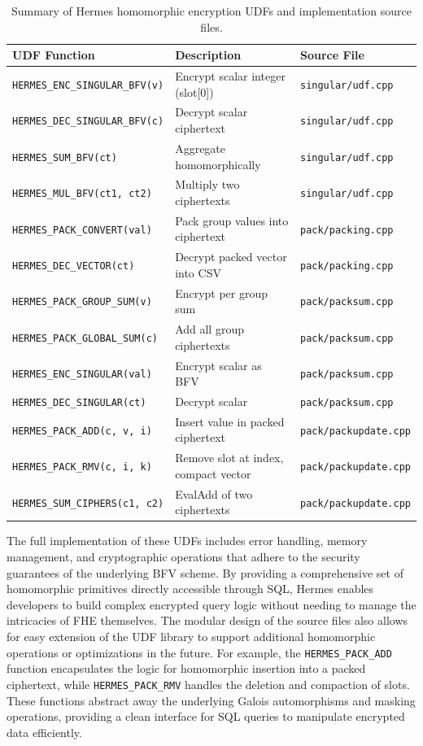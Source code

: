\documentclass[sigconf,nonacm]{acmart}
\begin{document}
\begin{table}[t]
\centering
\caption{Summary of Hermes homomorphic encryption UDFs and implementation source files.}
\label{tab:udf_list}
\scriptsize
\setlength{\tabcolsep}{2pt}
\begin{tabularx}{\columnwidth}{l X l}
\toprule
UDF Function & Description & Source File \\
\midrule
\texttt{HERMES\_ENC\_SINGULAR\_BFV(v)} & Encrypt scalar integer (slot[0]) & \texttt{singular/udf.cpp} \\
\texttt{HERMES\_DEC\_SINGULAR\_BFV(c)} & Decrypt scalar ciphertext & \texttt{singular/udf.cpp} \\
\texttt{HERMES\_SUM\_BFV(ct)} & Aggregate homomorphically & \texttt{singular/udf.cpp} \\
\texttt{HERMES\_MUL\_BFV(ct1, ct2)} & Multiply two ciphertexts & \texttt{singular/udf.cpp} \\
\addlinespace
\texttt{HERMES\_PACK\_CONVERT(val)} & Pack group values into ciphertext & \texttt{pack/packing.cpp} \\
\texttt{HERMES\_DEC\_VECTOR(ct)} & Decrypt packed vector into CSV & \texttt{pack/packing.cpp} \\
\texttt{HERMES\_PACK\_GROUP\_SUM(v)} & Encrypt per group sum & \texttt{pack/packsum.cpp} \\
\texttt{HERMES\_PACK\_GLOBAL\_SUM(c)} & Add all group ciphertexts & \texttt{pack/packsum.cpp} \\
\addlinespace
\texttt{HERMES\_ENC\_SINGULAR(val)} & Encrypt scalar as BFV & \texttt{pack/packsum.cpp} \\
\texttt{HERMES\_DEC\_SINGULAR(ct)} & Decrypt scalar & \texttt{pack/packsum.cpp} \\
\texttt{HERMES\_PACK\_ADD(c, v, i)} & Insert value in packed ciphertext & \texttt{pack/packupdate.cpp} \\
\texttt{HERMES\_PACK\_RMV(c, i, k)} & Remove slot at index, compact vector & \texttt{pack/packupdate.cpp} \\
\texttt{HERMES\_SUM\_CIPHERS(c1, c2)} & EvalAdd of two ciphertexts & \texttt{pack/packupdate.cpp} \\
\bottomrule
\end{tabularx}
\end{table}

The full implementation of these UDFs includes error handling, memory management, and cryptographic operations that adhere to the security guarantees of the underlying BFV scheme. By providing a comprehensive set of homomorphic primitives directly accessible through SQL, Hermes enables developers to build complex encrypted query logic without needing to manage the intricacies of FHE themselves. The modular design of the source files also allows for easy extension of the UDF library to support additional homomorphic operations or optimizations in the future. For example, the \texttt{HERMES\_PACK\_ADD} function encapsulates the logic for homomorphic insertion into a packed ciphertext, while \texttt{HERMES\_PACK\_RMV} handles the deletion and compaction of slots. These functions abstract away the underlying Galois automorphisms and masking operations, providing a clean interface for SQL queries to manipulate encrypted data efficiently.  
\end{document}
